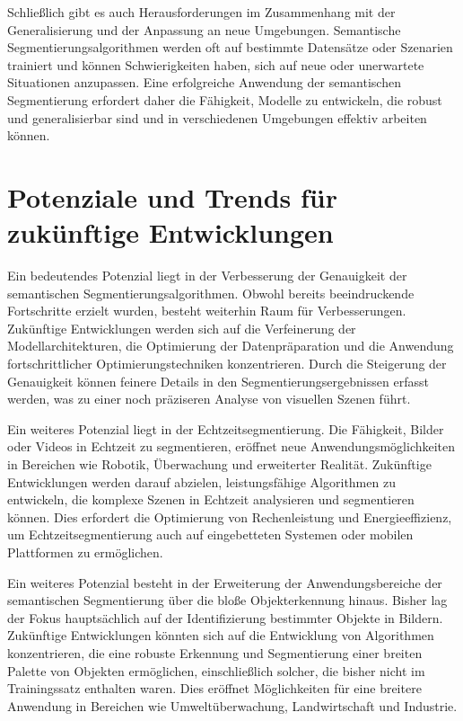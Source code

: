 Schließlich gibt es auch Herausforderungen im Zusammenhang mit der
Generalisierung und der Anpassung an neue Umgebungen. Semantische
Segmentierungsalgorithmen werden oft auf bestimmte Datensätze oder Szenarien
trainiert und können Schwierigkeiten haben, sich auf neue oder unerwartete
Situationen anzupassen. Eine erfolgreiche Anwendung der semantischen
Segmentierung erfordert daher die Fähigkeit, Modelle zu entwickeln, die robust
und generalisierbar sind und in verschiedenen Umgebungen effektiv arbeiten
können.
\section{Potenziale und Trends für zukünftige Entwicklungen}

Ein bedeutendes Potenzial liegt in der Verbesserung der Genauigkeit der
semantischen Segmentierungsalgorithmen. Obwohl bereits beeindruckende
Fortschritte erzielt wurden, besteht weiterhin Raum für Verbesserungen.
Zukünftige Entwicklungen werden sich auf die Verfeinerung der
Modellarchitekturen, die Optimierung der Datenpräparation und die Anwendung
fortschrittlicher Optimierungstechniken konzentrieren. Durch die Steigerung der
Genauigkeit können feinere Details in den Segmentierungsergebnissen erfasst
werden, was zu einer noch präziseren Analyse von visuellen Szenen führt.

Ein weiteres Potenzial liegt in der Echtzeitsegmentierung. Die Fähigkeit,
Bilder oder Videos in Echtzeit zu segmentieren, eröffnet neue
Anwendungsmöglichkeiten in Bereichen wie Robotik, Überwachung und erweiterter
Realität. Zukünftige Entwicklungen werden darauf abzielen, leistungsfähige
Algorithmen zu entwickeln, die komplexe Szenen in Echtzeit analysieren und
segmentieren können. Dies erfordert die Optimierung von Rechenleistung und
Energieeffizienz, um Echtzeitsegmentierung auch auf eingebetteten Systemen oder
mobilen Plattformen zu ermöglichen.

Ein weiteres Potenzial besteht in der Erweiterung der Anwendungsbereiche der
semantischen Segmentierung über die bloße Objekterkennung hinaus. Bisher lag
der Fokus hauptsächlich auf der Identifizierung bestimmter Objekte in Bildern.
Zukünftige Entwicklungen könnten sich auf die Entwicklung von Algorithmen
konzentrieren, die eine robuste Erkennung und Segmentierung einer breiten
Palette von Objekten ermöglichen, einschließlich solcher, die bisher nicht im
Trainingssatz enthalten waren. Dies eröffnet Möglichkeiten für eine breitere
Anwendung in Bereichen wie Umweltüberwachung, Landwirtschaft und Industrie.

